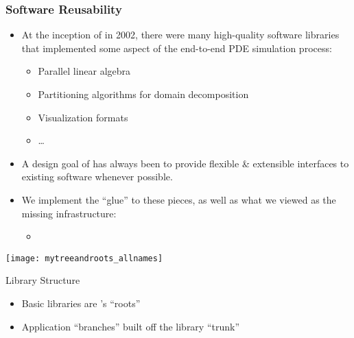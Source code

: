 \frame
{
  \frametitle{Software Reusability}
  \begin{itemize}
    \item At the inception of \libMesh{} in 2002, there were many high-quality software libraries that implemented some aspect of the end-to-end PDE simulation process:
      \begin{itemize}
        \item Parallel linear algebra
        \item Partitioning algorithms for domain decomposition
        \item Visualization formats
        \item \ldots
      \end{itemize}
    \item A design goal of \libMesh{} has always been to provide flexible \& extensible interfaces to existing software whenever possible.
    \item We implement the ``glue'' to these pieces, as well as what we viewed as the missing infrastructure:
      \begin{itemize}
        \item {}
      \end{itemize}          
  \end{itemize}  
}



\begin{frame}[t]


    \begin{minipage}[h]{.6\textwidth}
    \begin{center}
      \texttt{[image: mytreeandroots\_allnames]}
    \end{center}
  \end{minipage}
  \begin{minipage}[h]{.35\textwidth}
    \begin{block}{Library Structure}
      \begin{itemize}
    \item Basic libraries are \LibMesh's ``roots''
    \item Application ``branches'' built off the library ``trunk''
      \end{itemize}
    \end{block}
  \end{minipage}
\end{frame}


